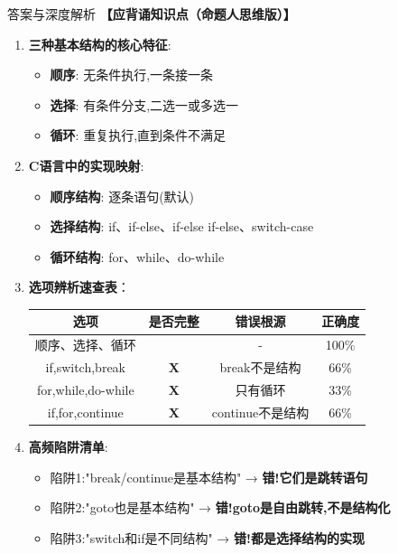 \documentclass[a4paper,12pt]{article}
\begin{document}
\begin{bluebox}{答案与深度解析}
	\textbf{【应背诵知识点（命题人思维版）】}
	\begin{enumerate}[leftmargin=*, nosep]
		\item \textbf{三种基本结构的核心特征}:
		      \begin{itemize}
			      \item \textbf{顺序}: 无条件执行,一条接一条
			      \item \textbf{选择}: 有条件分支,二选一或多选一
			      \item \textbf{循环}: 重复执行,直到条件不满足
		      \end{itemize}

		\item \textbf{C语言中的实现映射}:
		      \begin{itemize}
			      \item \textbf{顺序结构}: 逐条语句(默认)
			      \item \textbf{选择结构}: if、if-else、if-else if-else、switch-case
			      \item \textbf{循环结构}: for、while、do-while
		      \end{itemize}

		\item \textbf{选项辨析速查表}：
		      \begin{tabular}{|c|c|c|c|}
			      \hline
			      \textbf{选项}        & \textbf{是否完整} & \textbf{错误根源} & \textbf{正确度} \\
			      \hline
			      顺序、选择、循环           & \checkmark    & -             & 100\%        \\
			      \hline
			      if,switch,break    & \textbf{X}    & break不是结构     & 66\%         \\
			      \hline
			      for,while,do-while & \textbf{X}    & 只有循环          & 33\%         \\
			      \hline
			      if,for,continue    & \textbf{X}    & continue不是结构  & 66\%         \\
			      \hline
		      \end{tabular}

		\item \textbf{高频陷阱清单}:
		      \begin{itemize}
			      \item 陷阱1:"break/continue是基本结构" → \textbf{错!它们是跳转语句}
			      \item 陷阱2:"goto也是基本结构" → \textbf{错!goto是自由跳转,不是结构化}
			      \item 陷阱3:"switch和if是不同结构" → \textbf{错!都是选择结构的实现}
		      \end{itemize}
	\end{enumerate}


\end{bluebox}
\end{document}
